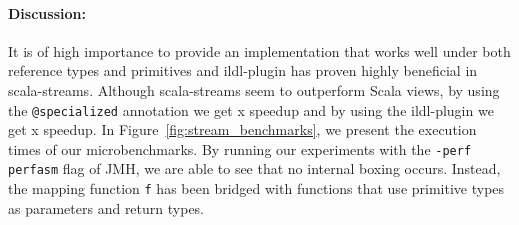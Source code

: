 \paragraph{Discussion: }  It is of high importance to provide an implementation
that works well under both reference types and primitives and ildl-plugin has
proven highly beneficial in scala-streams. Although scala-streams seem to
outperform Scala views, by using the \verb|@specialized| annotation we get
x speedup and by using the ildl-plugin we get x
speedup. In Figure~\ref{fig:stream_benchmarks}, we present the execution times
of our microbenchmarks. By running our experiments with the \verb|-perf perfasm|
flag of JMH, we are able to see that no internal boxing occurs. Instead, the
mapping function \verb|f| has been bridged with functions that use primitive
types as parameters and return types.



